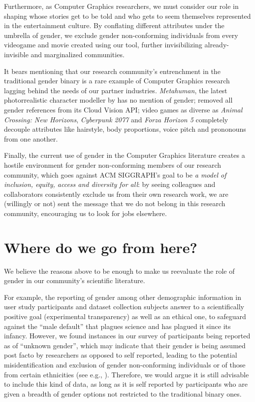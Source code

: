 \documentclass[sigconf,review,balance=false]{acmart}
\begin{document}
Furthermore, as Computer Graphics researchers, we must consider our role in
shaping whose stories get to be told and who gets to seem themselves represented
in the entertainment culture. By conflating different attributes under the
umbrella of gender, we exclude gender non-conforming individuals from every
videogame and movie created using our tool, further invisibilizing
already-invisible and marginalized communities.

It bears mentioning that our research community's entrenchment in the
traditional gender binary is a rare example of Computer Graphics research
lagging behind the needs of our partner industries. \emph{Metahuman}, the latest
photorrealistic character modeller by \citet{metahuman} has no mention of
gender; \citet{googlegender} removed all gender references from its Cloud Vision
API; video games as diverse as \emph{Animal Crossing: New Horizons},
\emph{Cyberpunk 2077} and \emph{Forza Horizon 5} completely decouple attributes
like hairstyle, body proportions, voice pitch and prononouns from one another.

Finally, the current use of gender in the Computer Graphics literature creates a
hostile environment for gender non-conforming members of our research community,
which goes against ACM SIGGRAPH's goal to be \emph{a model of inclusion, equity,
access and diversity for all}: by seeing colleagues and collaborators
consistently exclude us from their own research work, we are (willingly or not)
sent the message that we do not belong in this research community, encouraging
us to look for jobs elsewhere.


\section{Where do we go from here?}

We believe the reasons above to be enough to make us reevaluate the role of
gender in our community's scientific literature.

For example, the reporting of gender among other demographic information in user
study participants and dataset collection subjects answer to a scientifically
positive goal (experimental transparency) as well as an ethical one, to
safeguard against the “male default” that plagues science and has plagued it
since its infancy. However, we found instances in our survey of participants
being reported as of “unknown gender”, which may indicate that their gender is
being assumed post facto by researchers as opposed to self reported, leading to
the potential misidentification and exclusion of gender non-conforming
individuals or of those from certain ethnicities (see e.g.,
\cite{santamaria2018comparison,buolamwini2018gender}). Therefore, we would argue
it is still advisable to include this kind of data, as long as it is self
reported by participants who are given a breadth of gender options not
restricted to the traditional binary ones.
\end{document}
